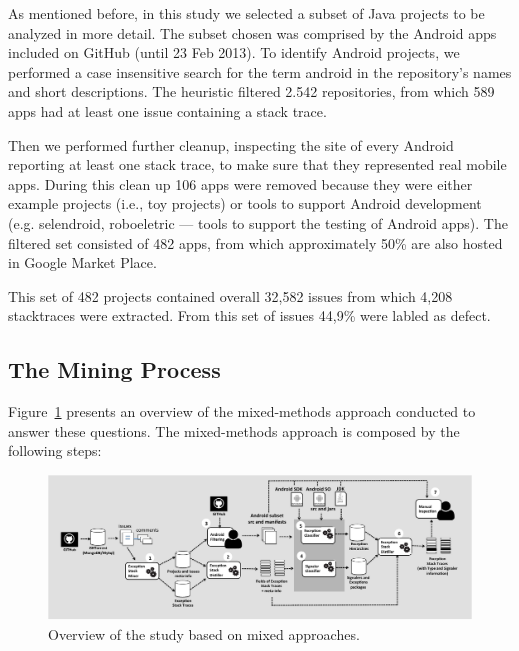 \documentclass[conference]{IEEEtran}
\begin{document}


As mentioned before, in this study we selected a subset of Java projects to
be analyzed in more detail. The subset chosen was comprised by the Android apps
included on GitHub (until 23 Feb 2013).
To identify Android projects, we performed a case insensitive search for the
term \textsf{android} in the repository's names and short descriptions.  The
heuristic filtered 2.542 repositories, from which 589 apps had at least one
issue containing a stack trace.

Then we performed further cleanup, inspecting the site of every Android
reporting at least one stack trace, to make sure that they represented real
mobile apps. During this clean up 106 apps were removed because they were either
example projects (i.e., toy projects) or tools to support Android development
(e.g. \textsf{selendroid}, \textsf{roboeletric} --- tools to support the testing of Android apps).
The filtered set consisted of 482 apps, from which approximately 50\% are also
hosted in Google Market Place. 

This set of 482 projects contained overall 32,582 issues from which 4,208 stacktraces 
were extracted. From this set of issues 44,9\% were labled as defect.

\subsection{The Mining Process}
\label{sec:miningproc}

Figure~\ref{fig:overviewfig} presents an overview of the mixed-methods approach
conducted to answer these questions. The mixed-methods approach is composed by the following steps:

\begin{figure}
\centering
\includegraphics[width=\hsize]{overview.pdf}
\caption{Overview of the study based on mixed approaches.}
\label{fig:overviewfig}
\end{figure}
\end{document}
